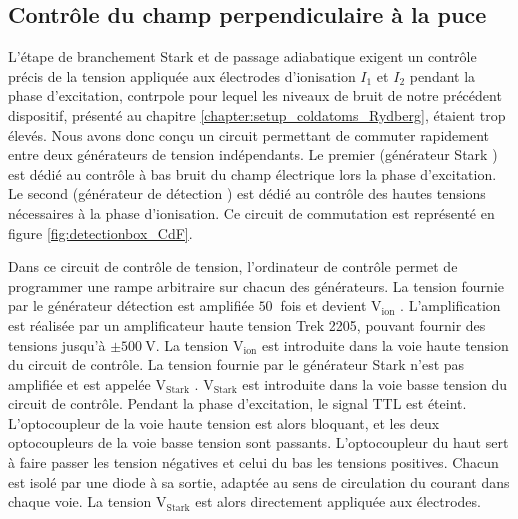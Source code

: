 \clearpage
\subsection{Contrôle du champ perpendiculaire à la puce} 
\noindent L'étape de branchement Stark et de passage adiabatique exigent un contrôle précis de la tension appliquée aux électrodes d'ionisation $I_1$ et $I_2$ pendant la phase d'excitation, contrpole pour lequel les niveaux de bruit de notre précédent dispositif, présenté au chapitre \ref{chapter:setup_coldatoms_Rydberg}, étaient trop élevés.
Nous avons donc conçu un circuit permettant de commuter rapidement entre deux générateurs de tension indépendants.
Le premier (\og générateur Stark \fg{}) est dédié au contrôle à bas bruit du champ électrique lors la phase d'excitation.
Le second (\og générateur de détection \fg{}) est dédié au contrôle des hautes tensions nécessaires à la phase d'ionisation.
Ce circuit de commutation est représenté en figure \ref{fig:detectionbox_CdF}.

Dans ce circuit de contrôle de tension, l'ordinateur de contrôle permet de programmer une rampe arbitraire sur chacun des générateurs.
La tension fournie par le générateur \og détection \fg{} est amplifiée $\SI{50}{}$ fois et devient \og $\mathrm{V_{ion}}$ \fg{}.
L'amplification est réalisée par un amplificateur haute tension Trek 2205, pouvant fournir des tensions jusqu'à $\pm\SI{500}{\V}$.
La tension $\mathrm{V_{ion}}$ est introduite dans la voie haute tension du circuit de contrôle.
La tension fournie par le générateur \og Stark \fg{} n'est pas amplifiée et est appelée \og $\mathrm{V_{Stark}}$ \fg{}.
$\mathrm{V_{Stark}}$ est introduite dans la voie basse tension du circuit de contrôle.
Pendant la phase d'excitation, le signal TTL est éteint. L'optocoupleur de la voie haute tension est alors bloquant, et les deux optocoupleurs de la voie basse tension sont passants.
L'optocoupleur du haut sert à faire passer les tension négatives et celui du bas les tensions positives.
Chacun est isolé par une diode à sa sortie, adaptée au sens de circulation du courant dans chaque voie.
La tension $\mathrm{V_{Stark}}$ est alors directement appliquée aux électrodes.

